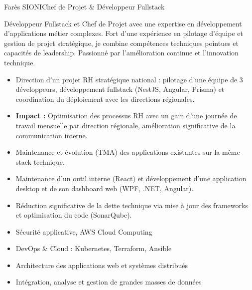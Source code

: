 \documentclass{article}
\begin{document}
\begin{cv}[profile][1.9]
{Farès SIONI}{Chef de Projet \& Développeur Fullstack}

Développeur Fullstack et Chef de Projet avec une expertise en développement d'applications métier complexes. Fort d'une expérience en pilotage d'équipe et gestion de projet stratégique, je combine compétences techniques pointues et capacités de leadership. Passionné par l'amélioration continue et l'innovation technique.

\begin{cvevent}[08/2023][08/2025]
    \begin{itemize}
        \item Direction d'un projet RH stratégique national : pilotage d'une équipe de 3 développeurs, développement fullstack (NestJS, Angular, Prisma) et coordination du déploiement avec les directions régionales.
        \item \textbf{Impact :} Optimisation des processus RH avec un gain d'une journée de travail mensuelle par direction régionale, amélioration significative de la communication interne.
        \newline
        \item Maintenance et évolution (TMA) des applications existantes sur la même stack technique.
    \end{itemize}
\end{cvevent}

\cvseparator[2]
\begin{cvevent}[06/2023][08/2023]
    \begin{itemize}
        \item Maintenance d'un outil interne (React) et développement d'une application desktop et de son dashboard web (WPF, .NET, Angular).
        \item Réduction significative de la dette technique via mise à jour des frameworks et optimisation du code (SonarQube).
    \end{itemize}
\end{cvevent}

\begin{cvevent}[2023][2025]
    \begin{itemize}
        \item Sécurité applicative, AWS Cloud Computing
        \item DevOps \& Cloud : Kubernetes, Terraform, Ansible
        \item Architecture des applications web et systèmes distribués
        \item Intégration, analyse et gestion de grandes masses de données
    \end{itemize}
\end{cvevent}


\end{cv}
\end{document}
